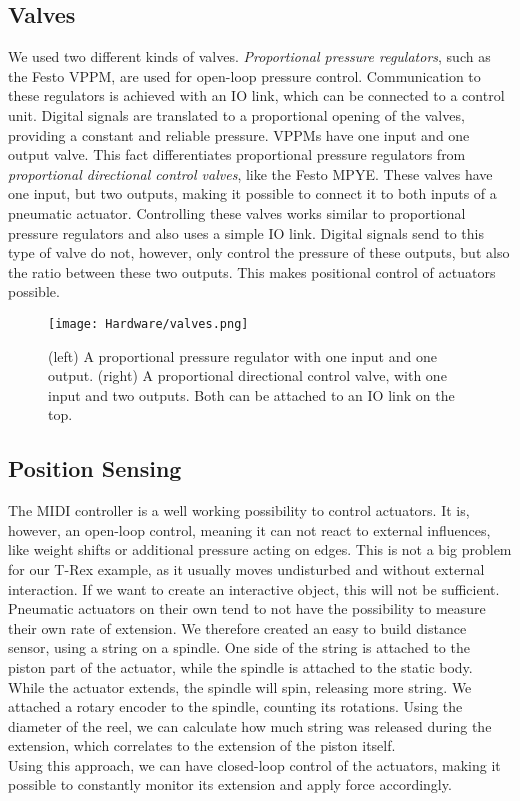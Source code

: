 \subsection{Valves}
We used two different kinds of valves. \textit{Proportional pressure regulators}, such as the Festo VPPM, are used for open-loop pressure control. Communication to these regulators is achieved with an IO link, which can be connected to a control unit. Digital signals are translated to a proportional opening of the valves, providing a constant and reliable pressure. VPPMs have one input and one output valve. This fact differentiates proportional pressure regulators from \textit{proportional directional control valves}, like the Festo MPYE. These valves have one input, but two outputs, making it possible to connect it to both inputs of a pneumatic actuator. Controlling these valves works similar to proportional pressure regulators and also uses a simple IO link. Digital signals send to this type of valve do not, however, only control the pressure of these outputs, but also the ratio between these two outputs. This makes positional control of actuators possible.

\begin{figure}[ht!]
    \texttt{[image: Hardware/valves.png]}
    \centering
    \caption{(left) A proportional pressure regulator with one input and one output. (right) A proportional directional control valve, with one input and two outputs. Both can be attached to an IO link on the top.}
    \label{fig:valves}
\end{figure}

\subsection{Position Sensing}
The MIDI controller is a well working possibility to control actuators. It is, however, an open-loop control, meaning it can not react to external influences, like weight shifts or additional pressure acting on edges. This is not a big problem for our T-Rex example, as it usually moves undisturbed and without external interaction. If we want to create an interactive object, this will not be sufficient.\\
Pneumatic actuators on their own tend to not have the possibility to measure their own rate of extension. We therefore created an easy to build distance sensor, using a string on a spindle. One side of the string is attached to the piston part of the actuator, while the spindle is attached to the static body. While the actuator extends, the spindle will spin, releasing more string. We attached a rotary encoder to the spindle, counting its rotations. Using the diameter of the reel, we can calculate how much string was released during the extension, which correlates to the extension of the piston itself.\\
Using this approach, we can have closed-loop control of the actuators, making it possible to constantly monitor its extension and apply force accordingly.

